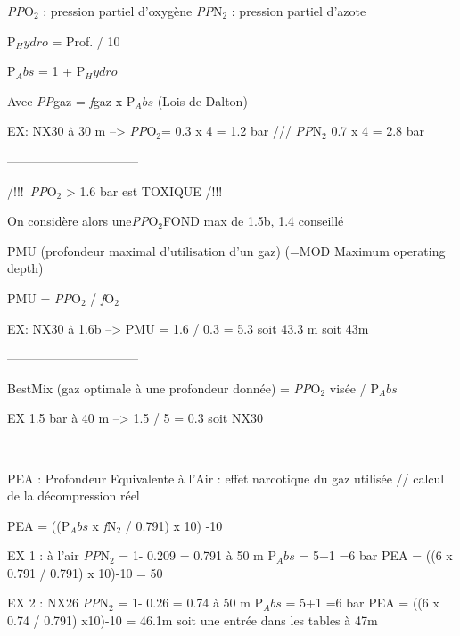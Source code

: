 \documentclass[report]{•}
\begin{document}
\textit{PP}O$_2$ : pression partiel d'oxygène
\textit{PP}N$_2$ : pression partiel d'azote 

P$_Hydro$ = Prof. / 10 

P$_Abs$ = 1 + P$_Hydro$

Avec \textit{PP}gaz = \textit{f}gaz x P$_Abs$  (Lois de Dalton) 

EX: NX30 à 30 m --> \textit{PP}O$_2$= 0.3 x 4 = 1.2 bar   ///  \textit{PP}N$_2$ 0.7 x 4 = 2.8 bar 

--------------------------------

/!\/!\/!\ \textit{PP}O$_2$ > 1.6 bar est TOXIQUE /!\/!\/!\

On considère alors une\textit{PP}O$_2$FOND max de 1.5b, 1.4 conseillé 

PMU (profondeur maximal d'utilisation d'un gaz) (=MOD Maximum operating depth) 

PMU =  \textit{PP}O$_2$ / \textit{f}O$_2$ 

EX: NX30 à 1.6b -->  PMU = 1.6 / 0.3 = 5.3 soit 43.3 m soit 43m

--------------------------------

BestMix (gaz optimale à une profondeur donnée)  = \textit{PP}O$_2$ visée / P$_Abs$ 

EX 1.5 bar à 40 m --> 1.5 / 5 = 0.3 soit NX30

--------------------------------

PEA : Profondeur Equivalente à l'Air : effet narcotique du gaz utilisée // calcul de la décompression réel

PEA = ((P$_Abs$ x \textit{f}N$_2$ / 0.791) x 10) -10

EX 1 : à l'air 
\textit{PP}N$_2$ = 1- 0.209 = 0.791
à 50 m  P$_Abs$ = 5+1 =6 bar
PEA = ((6 x 0.791 / 0.791) x 10)-10 = 50

EX 2 : NX26 
\textit{PP}N$_2$ = 1- 0.26 = 0.74
à 50 m  P$_Abs$ = 5+1 =6 bar
PEA = ((6 x 0.74 / 0.791) x10)-10 = 46.1m soit une entrée dans les tables à 47m 
\end{document}
